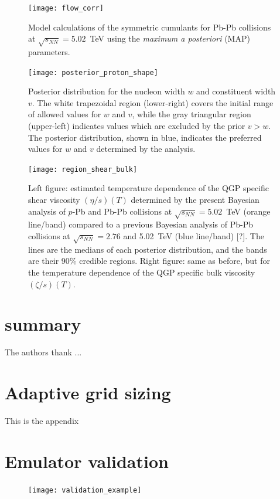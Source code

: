 \documentclass[aps,prc,reprint,amsmath,nofootinbib]{revtex4-1}
\newcommand{\sqrts}{\sqrt{s_{NN}}}
\newcommand{\note}{\textcolor{theblue}{[?]}}
\begin{document}
\begin{figure}
  \texttt{[image: flow\_corr]}
  \caption{Model calculations of the symmetric cumulants for Pb-Pb collisions at $\sqrts=5.02$~TeV using the \emph{maximum a posteriori} (MAP) parameters.}
  \label{fig:flow_corr}
\end{figure}

\begin{figure}
  \texttt{[image: posterior\_proton\_shape]}
  \caption{Posterior distribution for the nucleon width $w$ and constituent width $v$. The white trapezoidal region (lower-right) covers the initial range of allowed values for $w$ and $v$, while the gray triangular region (upper-left) indicates values which are excluded by the prior $v > w$. The posterior distribution, shown in blue, indicates the preferred values for $w$ and $v$ determined by the analysis.}
  \label{fig:posterior_proton_shape}
\end{figure}

\begin{figure}
  \texttt{[image: region\_shear\_bulk]}
  \caption{Left figure: estimated temperature dependence of the QGP specific shear viscosity $(\eta/s)(T)$ determined by the present Bayesian analysis of $p$-Pb and Pb-Pb collisions at $\sqrts=5.02$~TeV (orange line/band) compared to a previous Bayesian analysis of Pb-Pb collisions at $\sqrts=2.76$ and 5.02~TeV (blue line/band) \note. The lines are the medians of each posterior distribution, and the bands are their 90\% credible regions. Right figure: same as before, but for the temperature dependence of the QGP specific bulk viscosity $(\zeta/s)(T)$.}
  \label{fig:region_shear_bulk}
\end{figure}

\section{summary}
\label{sec:summary}

\begin{acknowledgments}
  The authors thank ...
\end{acknowledgments}

\appendix

\section{Adaptive grid sizing}
\label{appendix}
This is the appendix

\section{Emulator validation}
\label{app:validation}
\begin{figure}
  \texttt{[image: validation\_example]}
\end{figure}


\end{document}
